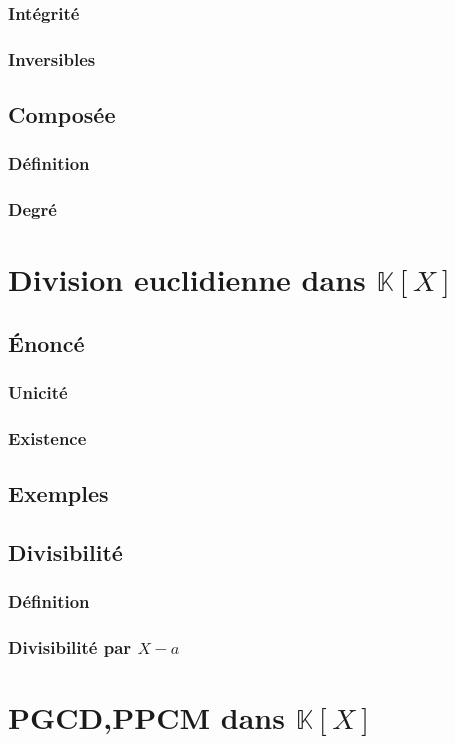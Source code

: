 \documentclass[12pt,a4paper,french]{book}
\begin{document}
			\subsubsection{Intégrité}
			\subsubsection{Inversibles}
		\subsection{Composée}
			\subsubsection{Définition}
			\subsubsection{Degré}
	\section{Division euclidienne dans $\mathbb{K}[X]$}
		\subsection{Énoncé}
			\subsubsection{Unicité}
			\subsubsection{Existence}
		\subsection{Exemples}
		\subsection{Divisibilité}
			\subsubsection{Définition}
			\subsubsection{Divisibilité par $X-a$}
	\section{PGCD,PPCM dans $\mathbb{K}[X]$}
\end{document}
